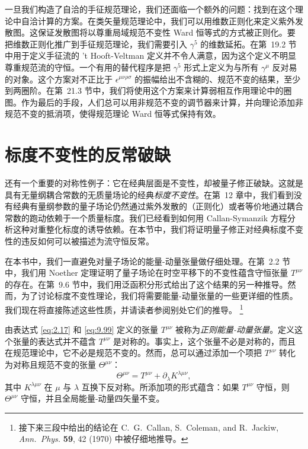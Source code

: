 一旦我们构造了自洽的手征规范理论，我们还面临一个额外的问题：找到在这个理论中自洽计算的方案。在类矢量规范理论中，我们可以用维数正则化来定义紫外发散图。这保证发散图将以尊重局域规范不变性 Ward 恒等式的方式被正则化。要把维数正则化推广到手征规范理论，我们需要引入 $\gamma^5$ 的维数延拓。在第~19.2 节中用于定义手征流的 't Hooft-Veltman 定义并不令人满意，因为这个定义不明显尊重规范流的守恒。一个有用的替代程序是把 $\gamma^5$ 形式上定义为与所有 $\gamma^\mu$ 反对易的对象。这个方案对不正比于 $\epsilon^{\mu\nu\rho\sigma}$ 的振幅给出不含糊的、规范不变的结果，至少到两圈阶。在第~21.3 节中，我们将使用这个方案来计算弱相互作用理论中的圈图。作为最后的手段，人们总可以用非规范不变的调节器来计算，并向理论添加非规范不变的抵消项，使得规范理论 Ward 恒等式保持有效。

\section{标度不变性的反常破缺}

还有一个重要的对称性例子：它在经典层面是不变性，却被量子修正破缺。这就是具有无量纲耦合常数的无质量场论的经典\emph{标度不变性}。在第~12 章中，我们看到没有经典有量纲参数的量子场论仍然通过紫外发散的（正则化）或者等价地通过耦合常数的跑动依赖于一个质量标度。我们已经看到如何用 Callan-Symanzik 方程分析这种对重整化标度的诱导依赖。在本节中，我们将证明量子修正对经典标度不变性的违反如何可以被描述为流守恒反常。

在本书中，我们一直避免对量子场论的能量-动量张量做仔细处理。在第~2.2 节中，我们用 Noether 定理证明了量子场论在时空平移下的不变性蕴含守恒张量 $T^{\mu\nu}$ 的存在。在第~9.6 节中，我们用泛函积分形式给出了这个结果的另一种推导。然而，为了讨论标度不变性理论，我们将需要能量-动量张量的一些更详细的性质。我们现在将直接陈述这些性质，并请读者参阅别处它们的推导。%
\footnote{接下来三段中给出的结论在 C.~G.~Callan, S.~Coleman, and R.~Jackiw,
\emph{Ann.\ Phys.} \textbf{59}, 42 (1970) 中被仔细地推导。}

由表达式 \eqref{eq:2.17} 和 \eqref{eq:9.99} 定义的张量 $T^{\mu\nu}$ 被称为\emph{正则能量-动量张量}。定义这个张量的表达式并不蕴含 $T^{\mu\nu}$ 是对称的。事实上，这个张量不必是对称的，而且在规范理论中，它不必是规范不变的。然而，总可以通过添加一个项把 $T^{\mu\nu}$ 转化为对称且规范不变的张量 $\Theta^{\mu\nu}$：
\begin{equation}
  \Theta^{\mu\nu} = T^{\mu\nu} + \partial_\lambda K^{\lambda\mu\nu} ,
  \label{eq:19.144}
\end{equation}
其中 $K^{\lambda\mu\nu}$ 在 $\mu$ 与 $\lambda$ 互换下反对称。所添加项的形式蕴含：如果 $T^{\mu\nu}$ 守恒，则 $\Theta^{\mu\nu}$ 守恒，并且全局能量-动量四矢量不变。


